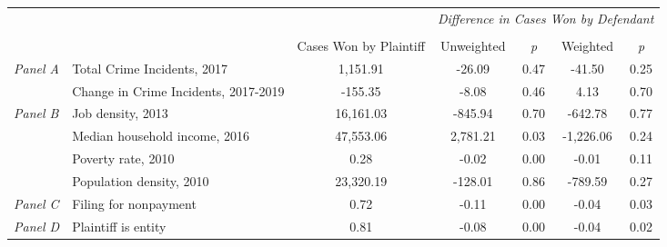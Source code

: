 \begin{tabular}{llccccc}
\toprule
 &  & \textit{} & \multicolumn{4}{c}{\textit{Difference in Cases Won by Defendant}} \\
\cline{4-7}
\\
 &  & Cases Won by Plaintiff & Unweighted & \emph{p} & Weighted & \emph{p} \\
\midrule
\multirow[c]{2}{.75cm}{\textit{Panel A}} & Total Crime Incidents, 2017 & 1,151.91 & -26.09 & 0.47 & -41.50 & 0.25 \\
 & Change in Crime Incidents, 2017-2019 & -155.35 & -8.08 & 0.46 & 4.13 & 0.70 \\
\cline{1-7}
\multirow[c]{4}{.75cm}{\textit{Panel B}} & Job density, 2013 & 16,161.03 & -845.94 & 0.70 & -642.78 & 0.77 \\
 & Median household income, 2016 & 47,553.06 & 2,781.21 & 0.03 & -1,226.06 & 0.24 \\
 & Poverty rate, 2010 & 0.28 & -0.02 & 0.00 & -0.01 & 0.11 \\
 & Population density, 2010 & 23,320.19 & -128.01 & 0.86 & -789.59 & 0.27 \\
\cline{1-7}
\textit{Panel C} & Filing for nonpayment & 0.72 & -0.11 & 0.00 & -0.04 & 0.03 \\
\cline{1-7}
\textit{Panel D} & Plaintiff is entity & 0.81 & -0.08 & 0.00 & -0.04 & 0.02 \\
\cline{1-7}
\bottomrule
\end{tabular}
